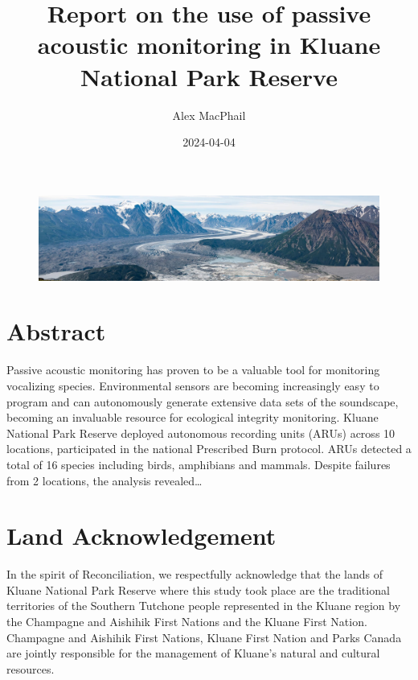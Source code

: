 \documentclass[
  letterpaper,
  DIV=11,
  numbers=noendperiod,
  oneside]{scrartcl}
\title{Report on the use of passive acoustic monitoring in Kluane
National Park Reserve}
\author{Alex MacPhail}
\date{2024-04-04}
\renewcommand*\contentsname{Table of contents}
\newcommand\contentsname{Table of contents}
\begin{document}
\maketitle
\ifdefined\Shaded\renewenvironment{Shaded}{\begin{tcolorbox}[frame hidden, interior hidden, breakable, enhanced, boxrule=0pt, sharp corners, borderline west={3pt}{0pt}{shadecolor}]}{\end{tcolorbox}}\fi

\renewcommand*\contentsname{Table of contents}
{
\hypersetup{linkcolor=}
\setcounter{tocdepth}{3}
\tableofcontents
}
\begin{figure}

{\centering \includegraphics{kluane-banner.jpg}

}

\end{figure}

\hypertarget{abstract}{%
\section{Abstract}\label{abstract}}

Passive acoustic monitoring has proven to be a valuable tool for
monitoring vocalizing species. Environmental sensors are becoming
increasingly easy to program and can autonomously generate extensive
data sets of the soundscape, becoming an invaluable resource for
ecological integrity monitoring. Kluane National Park Reserve deployed
autonomous recording units (ARUs) across 10 locations, participated in
the national Prescribed Burn protocol. ARUs detected a total of 16
species including birds, amphibians and mammals. Despite failures from 2
locations, the analysis revealed\ldots{}

\hypertarget{land-acknowledgement}{%
\section{Land Acknowledgement}\label{land-acknowledgement}}

In the spirit of Reconciliation, we respectfully acknowledge that the
lands of Kluane National Park Reserve where this study took place are
the traditional territories of the Southern Tutchone people represented
in the Kluane region by the Champagne and Aishihik First Nations and the
Kluane First Nation. Champagne and Aishihik First Nations, Kluane First
Nation and Parks Canada are jointly responsible for the management of
Kluane's natural and cultural resources.
\end{document}
